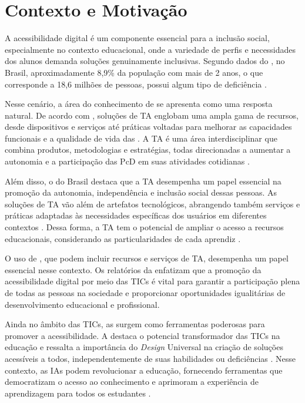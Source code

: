 \section{Contexto e Motivação}

A acessibilidade digital é um componente essencial para a inclusão social, especialmente no contexto educacional, onde a variedade de perfis e necessidades dos alunos demanda soluções genuinamente inclusivas. Segundo dados do , no Brasil, aproximadamente 8,9\% da população com mais de 2 anos, o que corresponde a 18,6 milhões de pessoas, possui algum tipo de deficiência \cite{IBGE2023}.

Nesse cenário, a área do conhecimento de  se apresenta como uma resposta natural. De acordo com , soluções de TA englobam uma ampla gama de recursos, desde dispositivos e serviços até práticas voltadas para melhorar as capacidades funcionais e a qualidade de vida das . A TA é uma área interdisciplinar que combina produtos, metodologias e estratégias, todas direcionadas a aumentar a autonomia e a participação das PcD em suas atividades cotidianas \cite{Cat2009}.

Além disso, o  do Brasil destaca que a TA desempenha um papel essencial na promoção da autonomia, independência e inclusão social dessas pessoas. As soluções de TA vão além de artefatos tecnológicos, abrangendo também serviços e práticas adaptadas às necessidades específicas dos usuários em diferentes contextos \cite{Cat2009}. Dessa forma, a TA tem o potencial de ampliar o acesso a recursos educacionais, considerando as particularidades de cada aprendiz \cite{UNESCO2023, GovBr2023}.

O uso de , que podem incluir recursos e serviços de TA, desempenha um papel essencial nesse contexto. Os relatórios da  enfatizam que a promoção da acessibilidade digital por meio das TICs é vital para garantir a participação plena de todas as pessoas na sociedade e proporcionar oportunidades igualitárias de desenvolvimento educacional e profissional.

Ainda no âmbito das TICs, as  surgem como ferramentas poderosas para promover a acessibilidade. A  destaca o potencial transformador das TICs na educação e ressalta a importância do \textit{Design} Universal na criação de soluções acessíveis a todos, independentemente de suas habilidades ou deficiências \cite{UNESCO2023, GovBr2023}. Nesse contexto, as IAs podem revolucionar a educação, fornecendo ferramentas que democratizam o acesso ao conhecimento e aprimoram a experiência de aprendizagem para todos os estudantes \cite{Holmes2019,UNESCO2024}.

